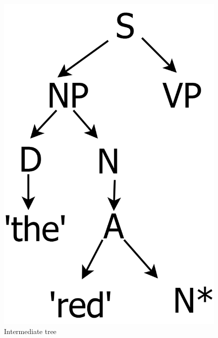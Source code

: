 \begin{figure}[ht]
\begin{minipage}[b]{0.3\linewidth}
\includegraphics[width=\linewidth]{tree-2.png}
\caption{Intermediate tree}
\label{tree-2}
\end{minipage}
\quad
\begin{minipage}[b]{0.3\linewidth}

\end{minipage}
\end{figure}
